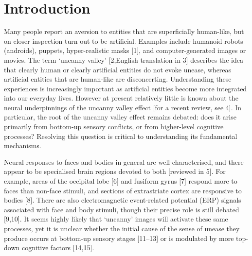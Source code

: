 \documentclass[
]{article}
\begin{document}
\section{Introduction}\label{introduction}

Many people report an aversion to entities that are superficially human-like, but on closer inspection turn out to be artificial. Examples include humanoid robots (androids), puppets, hyper-realistic masks {[}1{]}, and computer-generated images or movies. The term `uncanny valley' {[}2,English translation in 3{]} describes the idea that clearly human or clearly artificial entities do not evoke unease, whereas artificial entities that are human-like are disconcerting. Understanding these experiences is increasingly important as artificial entities become more integrated into our everyday lives. However at present relatively little is known about the neural underpinnings of the uncanny valley effect {[}for a recent review, see 4{]}. In particular, the root of the uncanny valley effect remains debated: does it arise primarily from bottom-up sensory conflicts, or from higher-level cognitive processes? Resolving this question is critical to understanding its fundamental mechanisms.

Neural responses to faces and bodies in general are well-characterised, and there appear to be specialised brain regions devoted to both {[}reviewed in 5{]}. For example, areas of the occipital lobe {[}6{]} and fusiform gyrus {[}7{]} respond more to faces than non-face stimuli, and sections of extrastriate cortex are responsive to bodies {[}8{]}. There are also electromagnetic event-related potential (ERP) signals associated with face and body stimuli, though their precise role is still debated {[}9,10{]}. It seems highly likely that `uncanny' images will activate these same processes, yet it is unclear whether the initial cause of the sense of unease they produce occurs at bottom-up sensory stages {[}11--13{]} or is modulated by more top-down cognitive factors {[}14,15{]}.
\end{document}
